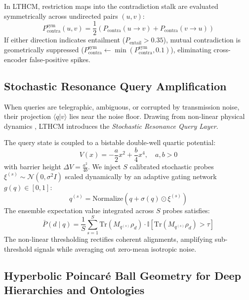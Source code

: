 \documentclass[11pt,a4paper]{article}
\begin{document}
In LTHCM, restriction maps into the contradiction stalk are evaluated symmetrically across undirected pairs $(u, v)$:
\begin{equation}
    P_{\mathrm{contra}}^{\mathrm{sym}}(u, v) = \frac{1}{2}\left( P_{\mathrm{contra}}(u \to v) + P_{\mathrm{contra}}(v \to u) \right)
\end{equation}
If either direction indicates entailment ($P_{\mathrm{entail}} > 0.35$), mutual contradiction is geometrically suppressed ($P_{\mathrm{contra}}^{\mathrm{sym}} \leftarrow \min(P_{\mathrm{contra}}^{\mathrm{sym}}, 0.1)$), eliminating cross-encoder false-positive spikes.

\subsection{Stochastic Resonance Query Amplification}

When queries are telegraphic, ambiguous, or corrupted by transmission noise, their projection $\langle q | v \rangle$ lies near the noise floor. Drawing from non-linear physical dynamics \cite{gammaitoni1998stochastic}, LTHCM introduces the \emph{Stochastic Resonance Query Layer}.

The query state is coupled to a bistable double-well quartic potential:
\begin{equation}
    V(x) = -\frac{a}{2} x^2 + \frac{b}{4} x^4, \quad a, b > 0
\end{equation}
with barrier height $\Delta V = \frac{a^2}{4b}$. We inject $S$ calibrated stochastic probes $\xi^{(s)} \sim \mathcal{N}(0, \sigma^2 I)$ scaled dynamically by an adaptive gating network $g(q) \in [0, 1]$:
\begin{equation}
    q^{(s)} = \mathrm{Normalize}\left( q + \sigma(q) \odot \xi^{(s)} \right)
\end{equation}
The ensemble expectation value integrated across $S$ probes satisfies:
\begin{equation}
    \bar{P}(d \mid q) = \frac{1}{S} \sum_{s=1}^S \mathrm{Tr}\left( M_{q^{(s)}} \rho_d \right) \cdot \mathbb{I}\left[ \mathrm{Tr}(M_{q^{(s)}} \rho_d) > \tau \right]
\end{equation}
The non-linear thresholding rectifies coherent alignments, amplifying sub-threshold signals while averaging out zero-mean isotropic noise.

\subsection{Hyperbolic Poincar{\'e} Ball Geometry for Deep Hierarchies and Ontologies}
\end{document}
